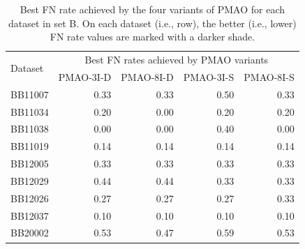\documentclass[a4paper,fleqn, review]{cas-dc}
\begin{document}
\begin{table}[!htbp]
	\small
\caption{Best FN rate achieved by the four variants of PMAO for each dataset in set B. On each dataset (i.e., row), the better (i.e., lower) FN rate values are marked with a darker shade.}
	\begin{tabular}{|l|r|r|r|r|}
		\hline
		\multirow{2}{*}{Dataset} & \multicolumn{4}{c|}{Best FN rates achieved by PMAO variants} \\
		\cline{2-5}          & \multicolumn{1}{l|}{PMAO-3I-D} & \multicolumn{1}{l|}{PMAO-8I-D} & \multicolumn{1}{l|}{PMAO-3I-S} & \multicolumn{1}{l|}{PMAO-8I-S} \\
		\hline
		BB11007 & \cellcolor[rgb]{ .384,  .745,  .478}0.33 & \cellcolor[rgb]{ .384,  .745,  .478}0.33 & \cellcolor[rgb]{ .988,  1,  .992}0.50 & \cellcolor[rgb]{ .384,  .745,  .478}0.33 \\
		\hline
		BB11034 & \cellcolor[rgb]{ .988,  1,  .992}0.20 & \cellcolor[rgb]{ .384,  .745,  .478}0.00 & \cellcolor[rgb]{ .988,  1,  .992}0.20 & \cellcolor[rgb]{ .988,  1,  .992}0.20 \\
		\hline
		BB11038 & \cellcolor[rgb]{ .384,  .745,  .478}0.00 & \cellcolor[rgb]{ .384,  .745,  .478}0.00 & \cellcolor[rgb]{ .988,  1,  .992}0.40 & \cellcolor[rgb]{ .384,  .745,  .478}0.00 \\
		\hline
		BB11019 & \cellcolor[rgb]{ .988,  1,  .992}0.14 & \cellcolor[rgb]{ .988,  1,  .992}0.14 & \cellcolor[rgb]{ .988,  1,  .992}0.14 & \cellcolor[rgb]{ .988,  1,  .992}0.14 \\
		\hline
		BB12005 & \cellcolor[rgb]{ .988,  1,  .992}0.33 & \cellcolor[rgb]{ .988,  1,  .992}0.33 & \cellcolor[rgb]{ .988,  1,  .992}0.33 & \cellcolor[rgb]{ .988,  1,  .992}0.33 \\
		\hline
		BB12029 & \cellcolor[rgb]{ .988,  1,  .992}0.44 & \cellcolor[rgb]{ .988,  1,  .992}0.44 & \cellcolor[rgb]{ .384,  .745,  .478}0.33 & \cellcolor[rgb]{ .384,  .745,  .478}0.33 \\
		\hline
		BB12026 & \cellcolor[rgb]{ .384,  .745,  .478}0.27 & \cellcolor[rgb]{ .384,  .745,  .478}0.27 & \cellcolor[rgb]{ .384,  .745,  .478}0.27 & \cellcolor[rgb]{ .988,  1,  .992}0.33 \\
		\hline
		BB12037 & \cellcolor[rgb]{ .988,  1,  .992}0.10 & \cellcolor[rgb]{ .988,  1,  .992}0.10 & \cellcolor[rgb]{ .988,  1,  .992}0.10 & \cellcolor[rgb]{ .988,  1,  .992}0.10 \\
		\hline
		BB20002 & \cellcolor[rgb]{ .686,  .871,  .733}0.53 & \cellcolor[rgb]{ .384,  .745,  .478}0.47 & \cellcolor[rgb]{ .988,  1,  .992}0.59 & \cellcolor[rgb]{ .686,  .871,  .733}0.53 \\

\end{tabular}
\end{table}
\end{document}
